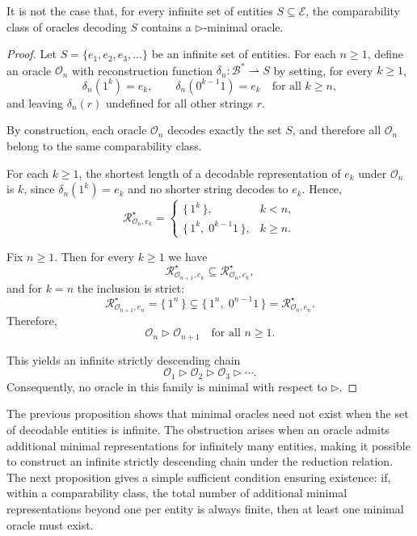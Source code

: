 \begin{proposition}
\label{prop:nonexistence_minimal_infinite}
It is not the case that, for every infinite set of entities $S \subseteq \mathcal{E}$, the comparability class of oracles decoding $S$ contains a $\triangleright$-minimal oracle.
\end{proposition}

\begin{proof}
Let $S=\{e_1, e_2, e_3, \dots\}$ be an infinite set of entities. For each $n \ge 1$, define an oracle $\mathcal{O}_n$ with reconstruction function $\delta_n:\mathcal{B}^\ast\rightharpoonup S$ by setting, for every $k \ge 1$,
\[
\delta_n(1^k)=e_k,
\qquad
\delta_n(0^{k-1}1)=e_k \quad \text{for all } k\ge n,
\]
and leaving $\delta_n(r)$ undefined for all other strings $r$.

By construction, each oracle $\mathcal{O}_n$ decodes exactly the set $S$, and therefore all $\mathcal{O}_n$ belong to the same comparability class.

For each $k \ge 1$, the shortest length of a decodable representation of $e_k$ under $\mathcal{O}_n$ is $k$, since $\delta_n(1^k)=e_k$ and no shorter string decodes to $e_k$. Hence,
\[
\mathcal{R}^\star_{\mathcal{O}_n, e_k}
=
\begin{cases}
\{\,1^k\,\}, & k < n,\\[4pt]
\{\,1^k,\;0^{k-1}1\,\}, & k \ge n.
\end{cases}
\]

Fix $n \ge 1$. Then for every $k \ge 1$ we have
\[
\mathcal{R}^\star_{\mathcal{O}_{n+1}, e_k}
\subseteq
\mathcal{R}^\star_{\mathcal{O}_n, e_k},
\]
and for $k=n$ the inclusion is strict:
\[
\mathcal{R}^\star_{\mathcal{O}_{n+1}, e_n}
=
\{\,1^n\,\}
\subsetneq
\{\,1^n,\;0^{n-1}1\,\}
=
\mathcal{R}^\star_{\mathcal{O}_n, e_n}.
\]
Therefore,
\[
\mathcal{O}_n \triangleright \mathcal{O}_{n+1}
\quad \text{for all } n \ge 1.
\]

This yields an infinite strictly descending chain
\[
\mathcal{O}_1 \triangleright \mathcal{O}_2 \triangleright \mathcal{O}_3 \triangleright \cdots.
\]
Consequently, no oracle in this family is minimal with respect to $\triangleright$.
\end{proof}

The previous proposition shows that minimal oracles need not exist when the set of decodable entities is infinite. The obstruction arises when an oracle admits additional minimal representations for infinitely many entities, making it possible to construct an infinite strictly descending chain under the reduction relation. The next proposition gives a simple sufficient condition ensuring existence: if, within a comparability class, the total number of additional minimal representations beyond one per entity is always finite, then at least one minimal oracle must exist.

